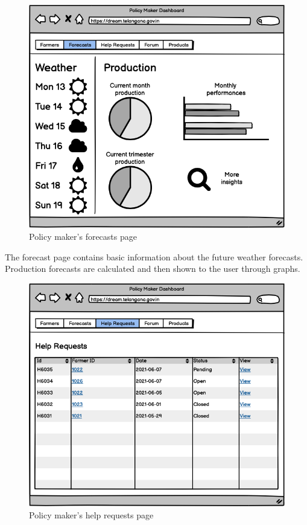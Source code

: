 \documentclass[10pt]{article} %
\begin{document}
\begin{figure}[h]
    \centering
    \includegraphics[scale=0.4]{images/uimockups/pm_forecasts.png}
    \caption{Policy maker's forecasts page}
    \label{fig:ui_pm_forecasts}
\end{figure}
The forecast page contains basic information about the future weather forecasts. Production forecasts are calculated and then shown to the user through
graphs.\\
\begin{figure}[h]
    \centering
    \includegraphics[scale=0.4]{images/uimockups/pm_helprequests.png}
    \caption{Policy maker's help requests page}
    \label{fig:ui_pm_helprequests}
\end{figure}
\end{document}
